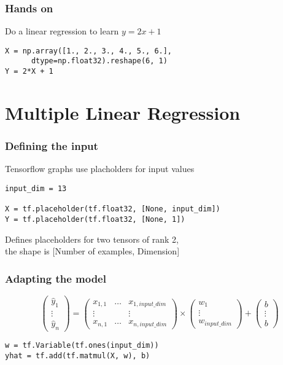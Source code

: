 \documentclass{beamer}
\begin{document}
\begin{frame}[fragile]
\frametitle{Hands on}

Do a linear regression to learn $y = 2x + 1$

\begin{lstlisting}
X = np.array([1., 2., 3., 4., 5., 6.],
      dtype=np.float32).reshape(6, 1)
Y = 2*X + 1
\end{lstlisting}
\end{frame}


\section{Multiple Linear Regression}

\begin{frame}[fragile]
\frametitle{Defining the input}

Tensorflow graphs use placholders for input values

\begin{lstlisting}
input_dim = 13

X = tf.placeholder(tf.float32, [None, input_dim])
Y = tf.placeholder(tf.float32, [None, 1])
\end{lstlisting}

Defines placeholders for two tensors of rank 2,\\
the shape is [Number of examples, Dimension]
\end{frame}

\begin{frame}[fragile]
\frametitle{Adapting the model}

\begin{displaymath}
  \begin{pmatrix} \hat{y}_1\\\vdots\\\hat{y}_n\end{pmatrix} =
  \begin{pmatrix} x_{1,1} & \hdots & x_{1,input\_dim}\\\vdots && \vdots\\x_{n,1} & \hdots & x_{n,input\_dim}\end{pmatrix} \times
  \begin{pmatrix} w_1 \\\vdots\\w_{input\_dim}\end{pmatrix} +
  \begin{pmatrix} b\\\vdots\\b\end{pmatrix}
\end{displaymath}

\begin{lstlisting}
w = tf.Variable(tf.ones(input_dim))
yhat = tf.add(tf.matmul(X, w), b)
\end{lstlisting}
\end{frame}
\end{document}
